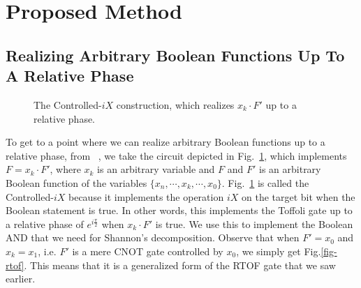 
  

\section{Proposed Method}
\label{Sec:proposed}
\subsection{Realizing Arbitrary Boolean Functions Up To A Relative Phase}
\label{Subsec:FNOT}

\begin{figure}[t]
    \centering
    \scalebox{0.8} {
    
    }
    \caption{The Controlled-$iX$ construction, which realizes $x_k \cdot F'$ up to a relative phase.}
    \label{fig-f-dot-g}
\end{figure}

To get to a point where we can realize arbitrary Boolean functions up to a relative
phase, from ~\cite{bib-amy-phase-state}, we take the circuit depicted in
Fig.~\ref{fig-f-dot-g}, which implements $F=x_k \cdot F'$, where $x_k$ is an arbitrary
variable and $F$ and $F'$ is an arbitrary Boolean function of the variables $\{x_n,\cdots,x_k,\cdots,x_0\}$.
Fig.~\ref{fig-f-dot-g} is called
the Controlled-$iX$ because it implements the operation $iX$ on the target bit when the
Boolean statement is true. In other words, this implements the Toffoli gate up to a relative phase of
$e^{i\frac{\pi}{2}}$ when $x_k \cdot F'$ is true. We use this
to implement the Boolean AND that we need for Shannon's decomposition. Observe that when
$F'=x_0$ and $x_k = x_1$, i.e. $F'$ is a mere CNOT gate controlled by $x_0$, we simply
get Fig.\ref{fig-rtof}. This means that it is a generalized form of the RTOF gate that we
saw earlier.

